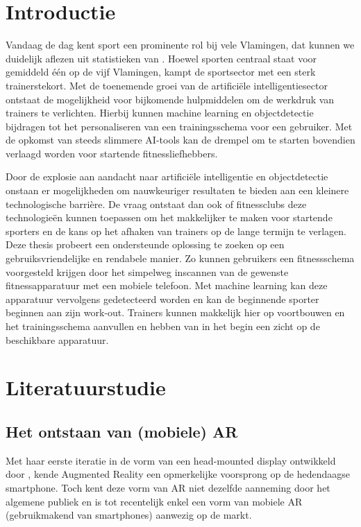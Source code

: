 
\section{Introductie}%
\label{sec:introductie}
Vandaag de dag kent sport een prominente rol bij vele Vlamingen, dat kunnen we duidelijk aflezen uit statistieken van \textcite{StatistiekVlaanderen2023} .
Hoewel sporten centraal staat voor gemiddeld \'e\'en op de vijf Vlamingen, kampt de sportsector met een sterk trainerstekort. \autocite{SportVlaanderen2023}
Met de toenemende groei van de artifici\"ele intelligentiesector ontstaat de mogelijkheid voor bijkomende hulpmiddelen om de werkdruk van trainers te verlichten.
Hierbij kunnen machine learning en objectdetectie bijdragen tot het personaliseren van een trainingsschema voor een gebruiker.
Met de opkomst van steeds slimmere AI-tools kan de drempel om te starten bovendien verlaagd worden voor startende fitnessliefhebbers.

Door de explosie aan aandacht naar artifici\"ele intelligentie en objectdetectie onstaan er mogelijkheden om nauwkeuriger resultaten te bieden aan een kleinere technologische barri\`ere.
De vraag ontstaat dan ook of fitnessclubs deze technologie\"en kunnen toepassen om het makkelijker te maken voor startende sporters en de kans op het afhaken van trainers op de lange termijn te verlagen.
Deze thesis probeert een ondersteunde oplossing te zoeken op een gebruiksvriendelijke en rendabele manier.
Zo kunnen gebruikers een fitnessschema voorgesteld krijgen door het simpelweg inscannen van de gewenste fitnessapparatuur met een mobiele telefoon.
Met machine learning kan deze apparatuur vervolgens gedetecteerd worden en kan de beginnende sporter beginnen aan zijn work-out.
Trainers kunnen makkelijk hier op voortbouwen en het trainingsschema aanvullen en hebben van in het begin een zicht op de beschikbare apparatuur.


\section{Literatuurstudie}%
\label{sec:state-of-the-art}

\subsection{Het ontstaan van (mobiele) AR}
\label{subsec:wat-is-ar}
Met haar eerste iteratie in de vorm van een head-mounted display ontwikkeld door \textcite{Sutherland1968} , kende Augmented Reality een opmerkelijke voorsprong op de hedendaagse smartphone.
Toch kent deze vorm van AR niet dezelfde aanneming door het algemene publiek en is tot recentelijk enkel een vorm van mobiele AR (gebruikmakend van smartphones) aanwezig op de markt.

